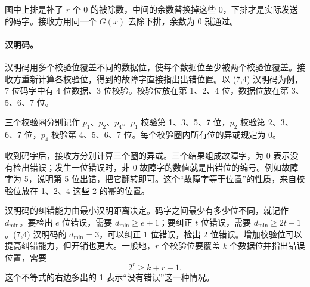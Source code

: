 图中上排是补了 $r$ 个 0 的被除数，中间的余数替换掉这些 0，下排才是实际发送的码字。接收方用同一个 $G(x)$ 去除下排，余数为 0 就通过。

\paragraph{汉明码。}汉明码用多个校验位覆盖不同的数据位，使每个数据位至少被两个校验位覆盖。接收方重新计算各校验位，得到的故障字直接指出出错位置。以 (7,4) 汉明码为例，7 位码字中有 4 位数据、3 位校验。校验位放在第 1、2、4 位，数据位放在第 3、5、6、7 位。

三个校验圈分别记作 $p_1$、$p_2$、$p_4$。$p_1$ 校验第 1、3、5、7 位，$p_2$ 校验第 2、3、6、7 位，$p_4$ 校验第 4、5、6、7 位。每个校验圈内所有位的异或规定为 0。

\begin{center}
\end{center}

收到码字后，接收方分别计算三个圈的异或。三个结果组成故障字，为 0 表示没有检出错误；发生一位错误时，非 0 故障字的数值就是出错位的编号。例如故障字为 5，说明第 5 位出错，把它翻转即可。这个“故障字等于位置”的性质，来自校验位放在 1、2、4 这些 2 的幂的位置。

汉明码的纠错能力由最小汉明距离决定。码字之间最少有多少位不同，就记作 $d_{\min}$。要检出 $e$ 位错误，需要 $d_{\min}\ge e+1$；要纠正 $t$ 位错误，需要 $d_{\min}\ge 2t+1$。(7,4) 汉明码的 $d_{\min}=3$，可以纠正 1 位错误，检出 2 位错误。增加校验位可以提高纠错能力，但开销也更大。一般地，$r$ 个校验位要覆盖 $k$ 个数据位并指出错误位置，需要
\[
2^r\ge k+r+1.
\]
这个不等式的右边多出的 1 表示“没有错误”这一种情况。

